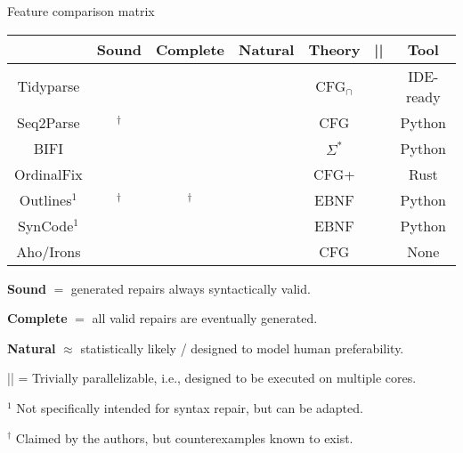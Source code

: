 \documentclass{beamer}
\newcommand{\cmark}{\ding{51}}%
\newcommand{\xmark}{\ding{55}}%
\begin{document}
\begin{frame}[fragile]{Feature comparison matrix}
\begin{table}
\begin{tabular}{c|cccccc}
             & \textbf{Sound}   & \textbf{Complete} & \textbf{Natural} & \textbf{Theory} & ||      & \textbf{Tool} \\\hline
Tidyparse    & \cmark           & \cmark            & \cmark           & CFG$_\cap$      & \cmark  & IDE-ready     \\
Seq2Parse    & \cmark$^\dagger$ & \xmark            & \cmark           & CFG             & \xmark  & Python        \\
BIFI         & \xmark           & \xmark            & \cmark           & $\Sigma^*$      & \xmark  & Python        \\
OrdinalFix   & \cmark           & \xmark            & \xmark           & CFG+            & \xmark  & Rust          \\
Outlines$^1$ & \cmark$^\dagger$ & \cmark$^\dagger$  & \cmark           & EBNF            & \xmark  & Python        \\
SynCode$^1$  & \cmark           & \cmark            & \cmark           & EBNF            & \xmark  & Python        \\
Aho/Irons    & \cmark           & \xmark            & \xmark           & CFG             & \xmark  & None          \\
\end{tabular}
\end{table}

\textbf{Sound} $=$ generated repairs always syntactically valid.

\textbf{Complete} $=$ all valid repairs are eventually generated.

\textbf{Natural} $\approx$ statistically likely / designed to model human preferability.

|| = Trivially parallelizable, i.e., designed to be executed on multiple cores.\\\vspace{0.3cm}

$^1$ Not specifically intended for syntax repair, but can be adapted.

$^\dagger$ Claimed by the authors, but counterexamples known to exist.
\end{frame}
\end{document}
